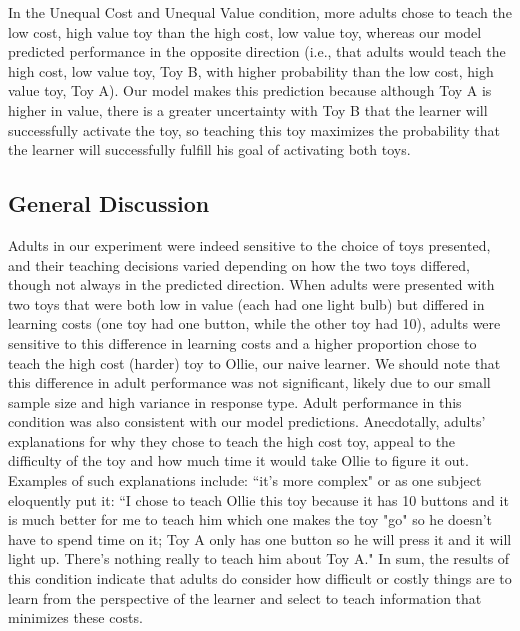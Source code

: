 \documentclass[10pt,letterpaper]{article}
\begin{document}
In the Unequal Cost and Unequal Value condition, more adults chose to teach the low cost, high value toy than the high cost, low value toy, whereas our model predicted performance in the opposite direction (i.e., that adults would teach the high cost, low value toy, Toy B, with higher probability than the low cost, high value toy, Toy A). Our model makes this prediction because although Toy A is higher in value, there is a greater uncertainty with Toy B that the learner will successfully activate the toy, so teaching this toy maximizes the probability that the learner will successfully fulfill his goal of activating both toys.

\subsection{General Discussion}

Adults in our experiment were indeed sensitive to the choice of toys presented, and their teaching decisions varied depending on how the two toys differed, though not always in the predicted direction. When adults were presented with two toys that were both low in value (each had one light bulb) but differed in learning costs (one toy had one button, while the other toy had 10), adults were sensitive to this difference in learning costs and a higher proportion chose to teach the high cost (harder) toy to Ollie, our naive learner. We should note that this difference in adult performance was not significant, likely due to our small sample size and high variance in response type. Adult performance in this condition was also consistent with our model predictions. Anecdotally, adults' explanations for why they chose to teach the high cost toy, appeal to the difficulty of the toy and how much time it would take Ollie to figure it out. Examples of such explanations include: ``it's more complex" or as one subject eloquently put it: ``I chose to teach Ollie this toy because it has 10 buttons and it is much better for me to teach him which one makes the toy "go" so he doesn't have to spend time on it; Toy A only has one button so he will press it and it will light up. There's nothing really to teach him about Toy A." In sum, the results of this condition indicate that adults do consider how difficult or costly things are to learn from the perspective of the learner and select to teach information that minimizes these costs. 
\end{document}
